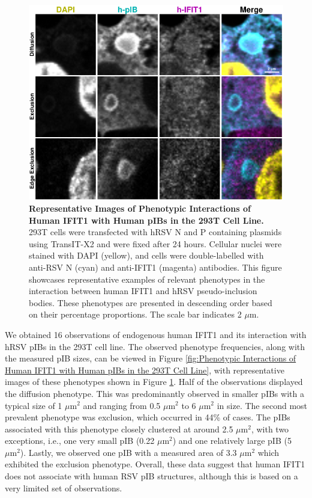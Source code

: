 \begin{figure}
    \centering
    \includegraphics[width=1\linewidth]{09. Chapter 4/Figs/01. pIB/02. IFIT1/03. i1-293t-hnhp.pdf}
    \caption[Representative Images of Phenotypic Interactions of Human IFIT1 with Human pIBs in the 293T Cell Line.]{\textbf{Representative Images of Phenotypic Interactions of Human IFIT1 with Human pIBs in the 293T Cell Line.} 293T cells were transfected with hRSV N and P containing plasmids using TransIT-X2 and were fixed after 24 hours. Cellular nuclei were stained with DAPI (yellow), and cells were double-labelled with anti-RSV N (cyan) and anti-IFIT1 (magenta) antibodies. This figure showcases representative examples of relevant phenotypes in the interaction between human IFIT1 and hRSV pseudo-inclusion bodies. These phenotypes are presented in descending order based on their percentage proportions. The scale bar indicates 2 \(\mu \mbox{m}\).}
    \label{fig:Representative Images of Phenotypic Interactions of Human IFIT1 with Human pIBs in the 293T Cell Line}
\end{figure}

We obtained 16 observations of endogenous human IFIT1 and its interaction with hRSV pIBs in the 293T cell line. The observed phenotype frequencies, along with the measured pIB sizes, can be viewed in Figure \ref{fig:Phenotypic Interactions of Human IFIT1 with Human pIBs in the 293T Cell Line}, with representative images of these phenotypes shown in Figure \ref{fig:Representative Images of Phenotypic Interactions of Human IFIT1 with Human pIBs in the 293T Cell Line}. Half of the observations displayed the diffusion phenotype. This was predominantly observed in smaller pIBs with a typical size of 1 \(\mu \mbox{m}^2\) and ranging from 0.5 \(\mu \mbox{m}^2\) to 6 \(\mu \mbox{m}^2\) in size. The second most prevalent phenotype was exclusion, which occurred in 44\% of cases. The pIBs associated with this phenotype closely clustered at around 2.5 \(\mu \mbox{m}^2\), with two exceptions, i.e., one very small pIB (0.22 \(\mu \mbox{m}^2\)) and one relatively large pIB (5 \(\mu \mbox{m}^2\)). Lastly, we observed one pIB with a measured area of 3.3 \(\mu \mbox{m}^2\) which exhibited the exclusion phenotype. Overall, these data suggest that human IFIT1 does not associate with human RSV pIB structures, although this is based on a very limited set of observations.

